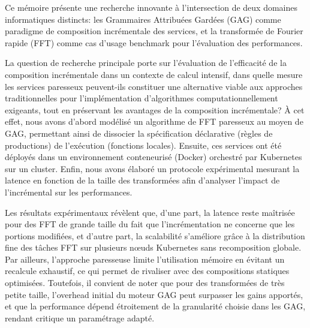 
Ce mémoire présente une recherche innovante à l'intersection de deux domaines informatiques distincts: les Grammaires Attribuées Gardées (GAG) comme paradigme de composition incrémentale des services, et la transformée de Fourier rapide (FFT) comme cas d'usage benchmark pour l'évaluation des performances.


La question de recherche principale porte sur l'évaluation de l'efficacité de la composition incrémentale dans un contexte de calcul intensif, dans quelle mesure les services paresseux peuvent-ils constituer une alternative viable aux approches traditionnelles pour l'implémentation d'algorithmes computationnellement exigeants, tout en préservant les avantages de la composition incrémentale? À cet effet, nous avons d'abord modélisé un algorithme de FFT paresseux au moyen de GAG, permettant ainsi de dissocier la spécification déclarative (règles de productions) de l'exécution (fonctions locales). Ensuite, ces services ont été déployés dans un environnement conteneurisé (Docker) orchestré par Kubernetes sur un cluster. Enfin, nous avons élaboré un protocole expérimental mesurant la latence en fonction de la taille des transformées afin d’analyser l’impact de l’incrémental sur les performances.

\vspace{1cm}

Les résultats expérimentaux révèlent que, d'une part, la latence reste maîtrisée pour des FFT de grande taille du fait que l'incrémentation ne concerne que les portions modifiées, et d'autre part, la scalabilité s'améliore grâce à la distribution fine des tâches FFT sur plusieurs nœuds Kubernetes sans recomposition globale. Par ailleurs, l'approche paresseuse limite l'utilisation mémoire en évitant un recalcule exhaustif, ce qui permet de rivaliser avec des compositions statiques optimisées. Toutefois, il convient de noter que pour des transformées de très petite taille, l'overhead initial du moteur GAG peut surpasser les gains apportés, et que la performance dépend étroitement de la granularité choisie dans les GAG, rendant critique un paramétrage adapté.

